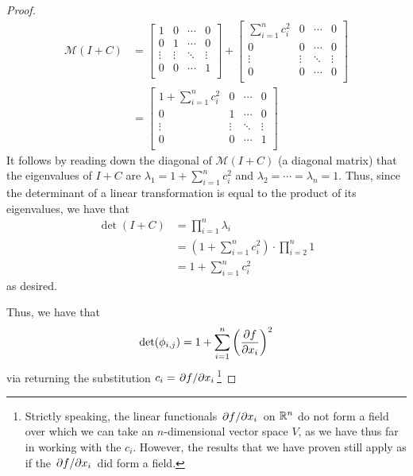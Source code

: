 \documentclass[../psets.tex]{subfiles}
\begin{document}
\begin{enumerate}[label={\textbf{4.4.\roman*.}}]
\begin{proof}
        \begin{align*}
            \mathcal{M}(I+C) &=
            \begin{bmatrix}
                1 & 0 & \cdots & 0\\
                0 & 1 & \cdots & 0\\
                \vdots & \vdots & \ddots & \vdots\\
                0 & 0 & \cdots & 1\\
            \end{bmatrix}
            +
            \begin{bmatrix}
                \sum_{i=1}^nc_i^2 & 0 & \cdots & 0\\
                0 & 0 & \cdots & 0\\
                \vdots & \vdots & \ddots & \vdots\\
                0 & 0 & \cdots & 0\\
            \end{bmatrix}\\
            &=
            \begin{bmatrix}
                1+\sum_{i=1}^nc_i^2 & 0 & \cdots & 0\\
                0 & 1 & \cdots & 0\\
                \vdots & \vdots & \ddots & \vdots\\
                0 & 0 & \cdots & 1\\
            \end{bmatrix}
        \end{align*}
        It follows by reading down the diagonal of $\mathcal{M}(I+C)$ (a diagonal matrix) that the eigenvalues of $I+C$ are $\lambda_1=1+\sum_{i=1}^nc_i^2$ and $\lambda_2=\cdots=\lambda_n=1$. Thus, since the determinant of a linear transformation is equal to the product of its eigenvalues, we have that
        \begin{align*}
            \det(I+C) &= \prod_{i=1}^n\lambda_i\\
            &= \left( 1+\sum_{i=1}^nc_i^2 \right)\cdot\prod_{i=2}^n1\\
            &= 1+\sum_{i=1}^nc_i^2
        \end{align*}
        as desired.\par
        Thus, we have that
        \begin{equation*}
            \det(\phi_{i,j}) = 1+\sum_{i=1}^n\left( \pdv{f}{x_i} \right)^2
        \end{equation*}
        via returning the substitution $c_i=\pdv*{f}{x_i}$\footnote{Strictly speaking, the linear functionals $\pdv*{f}{x_i}$ on $\mathbb{R}^n$ do not form a field over which we can take an $n$-dimensional vector space $V$, as we have thus far in working with the $c_i$. However, the results that we have proven still apply as if the $\pdv*{f}{x_i}$ did form a field.}\par\smallskip

\end{proof}
\end{enumerate}
\end{document}
